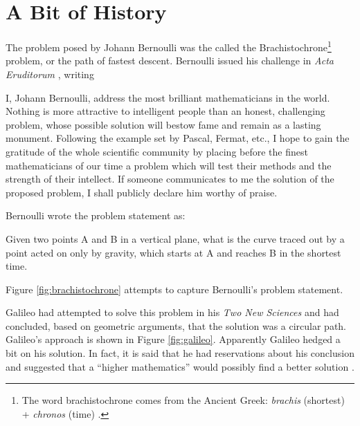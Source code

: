 \documentclass{article}
\theoremstyle{definition}
\begin{document}
\medskip
\section{A Bit of History}
\label{sec:history}
The problem posed by Johann Bernoulli was the called the
Brachistochrone\footnote{The word brachistochrone comes from the
Ancient Greek: \emph{brachis} (shortest) + \emph{chronos} (time)
\cite{enwikisource:6202943}.} problem, or the path of fastest
descent. Bernoulli issued his challenge in \emph{Acta Eruditorum}
\cite{1696acta}, writing

\bigskip
\begin{addmargin}[2em]{7em}
I, Johann Bernoulli, address the most brilliant mathematicians in
the world. Nothing is more attractive to intelligent people than
an honest, challenging problem, whose possible solution will
bestow fame and remain as a lasting monument. Following the
example set by Pascal, Fermat, etc., I hope to gain the gratitude
of the whole scientific community by placing before the finest
mathematicians of our time a problem which will test their
methods and the strength of their intellect. If someone
communicates to me the solution of the proposed problem, I shall
publicly declare him worthy of praise.
\end{addmargin}


\noindent
Bernoulli wrote the problem statement as:

\bigskip
\begin{addmargin}[2em]{7em}
Given two points A and B in a vertical plane, what is the curve
traced out by a point acted on only by gravity, which starts at A
and reaches B in the shortest time.
\end{addmargin}

\bigskip
\noindent
Figure \ref{fig:brachistochrone} attempts to capture Bernoulli's
problem statement.

\bigskip
\noindent
Galileo had attempted to solve this problem in his \emph{Two New
Sciences} \cite{wiki:two_new_sciences} and had concluded, based
on geometric arguments, that the solution was a circular
path. Galileo's approach is shown in Figure
\ref{fig:galileo}. Apparently Galileo hedged a bit on his
solution. In fact, it is said that he had reservations about his
conclusion and suggested that a “higher mathematics” would
possibly find a better solution \cite{brachistochrone_problem}.
\end{document}
